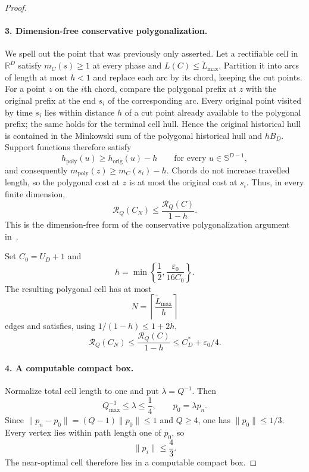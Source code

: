 \documentclass[10pt,a4paper]{article}
\newcommand{\R}{\mathbb{R}}
\newcommand{\Sph}{\mathbb{S}}
\newcommand{\cstar}{C^{*}}
\newcommand{\BD}{B_D}
\theoremstyle{plain}
\theoremstyle{definition}
\theoremstyle{remark}
\begin{document}
\begin{proof}
\paragraph{3. Dimension-free conservative polygonalization.}
We spell out the point that was previously only asserted. Let a rectifiable cell in $\R^D$ satisfy $m_C(s)\ge1$ at every phase and $L(C)\le\widetilde L_{\max}$. Partition it into arcs of length at most $h<1$ and replace each arc by its chord, keeping the cut points. For a point $z$ on the $i$th chord, compare the polygonal prefix at $z$ with the original prefix at the end $s_i$ of the corresponding arc. Every original point visited by time $s_i$ lies within distance $h$ of a cut point already available to the polygonal prefix; the same holds for the terminal cell hull. Hence the original historical hull is contained in the Minkowski sum of the polygonal historical hull and $h\BD$. Support functions therefore satisfy
\[
  h_{\mathrm{poly}}(u)\ge h_{\mathrm{orig}}(u)-h
  \qquad\text{for every }u\in\Sph^{D-1},
\]
and consequently $m_{\mathrm{poly}}(z)\ge m_C(s_i)-h$. Chords do not increase travelled length, so the polygonal cost at $z$ is at most the original cost at $s_i$. Thus, in every finite dimension,
\[
  \mathcal R_Q(C_N)\le\frac{\mathcal R_Q(C)}{1-h}.
\]
This is the dimension-free form of the conservative polygonalization argument in~\cite[Theorem~8.3]{koch-cell}.

Set $C_0=U_D+1$ and
\[
  h=\min\left\{\frac12,\frac{\varepsilon_0}{16C_0}\right\}.
\]
The resulting polygonal cell has at most
\[
  N=\left\lceil\frac{\widetilde L_{\max}}{h}\right\rceil
\]
edges and satisfies, using $1/(1-h)\le1+2h$,
\[
  \mathcal R_Q(C_N)
  \le\frac{\mathcal R_Q(C)}{1-h}
  \le\cstar_D+\varepsilon_0/4.
\]

\paragraph{4. A computable compact box.}
Normalize total cell length to one and put $\lambda=Q^{-1}$. Then
\[
  Q_{\max}^{-1}\le\lambda\le\frac14,
  \qquad
  p_0=\lambda p_n.
\]
Since $\|p_n-p_0\|=(Q-1)\|p_0\|\le1$ and $Q\ge4$, one has $\|p_0\|\le1/3$. Every vertex lies within path length one of $p_0$, so
\[
  \|p_i\|\le\frac43.
\]
The near-optimal cell therefore lies in a computable compact box.


\end{proof}
\end{document}
